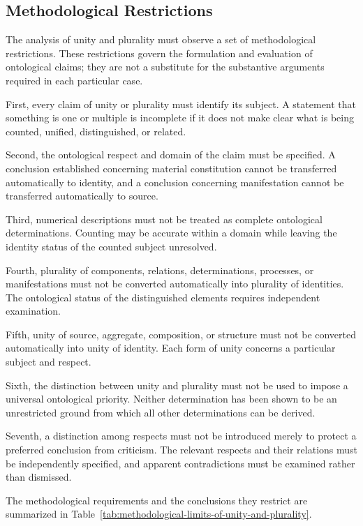 \subsection{Methodological Restrictions}

The analysis of unity and plurality must observe
a set of methodological restrictions. These
restrictions govern the formulation and evaluation
of ontological claims; they are not a substitute
for the substantive arguments required in each
particular case.

First, every claim of unity or plurality must
identify its subject. A statement that something
is one or multiple is incomplete if it does not
make clear what is being counted, unified,
distinguished, or related.

Second, the ontological respect and domain of
the claim must be specified. A conclusion
established concerning material constitution
cannot be transferred automatically to identity,
and a conclusion concerning manifestation
cannot be transferred automatically to source.

Third, numerical descriptions must not be treated
as complete ontological determinations. Counting
may be accurate within a domain while leaving
the identity status of the counted subject
unresolved.

Fourth, plurality of components, relations,
determinations, processes, or manifestations
must not be converted automatically into
plurality of identities. The ontological status
of the distinguished elements requires
independent examination.

Fifth, unity of source, aggregate, composition,
or structure must not be converted automatically
into unity of identity. Each form of unity
concerns a particular subject and respect.

Sixth, the distinction between unity and plurality
must not be used to impose a universal ontological
priority. Neither determination has been shown
to be an unrestricted ground from which all
other determinations can be derived.

Seventh, a distinction among respects must not
be introduced merely to protect a preferred
conclusion from criticism. The relevant respects
and their relations must be independently
specified, and apparent contradictions must
be examined rather than dismissed.

The methodological requirements and the
conclusions they restrict are summarized in
Table~\ref{tab:methodological-limits-of-unity-and-plurality}.

